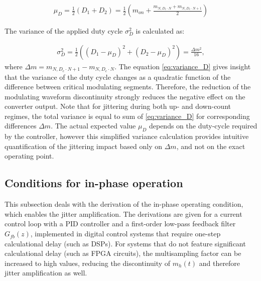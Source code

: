 \documentclass[journal]{IEEEtran}
\begin{document}
\begin{equation}
\begin{aligned}
\mu_D = \frac{1}{2} \left(D_1 + D_2 \right) = \frac{1}{2} \left(m_{on} +  \frac{ m_{N , D_c \cdot N} + m_{N , D_c \cdot N + 1}}{2}\right) \label{eq:expected_D} 
\end{aligned}    
\end{equation}

\noindent
The variance of the applied duty cycle $ \sigma ^2 _D$ is calculated as:

\begin{equation}
\begin{aligned}
 \sigma ^2 _D = \frac{1}{2} \left( \left( D_1 - \mu _D \right)^2 + \left( D_2 - \mu _D  \right)^2 \right)
= \frac{\Delta m^2 }{16},	\label{eq:variance_D} 
\end{aligned}    
\end{equation}
where $\Delta m = m_{N , D_c \cdot N + 1} - m_{N , D_c \cdot N}$.
\noindent
The equation \eqref{eq:variance_D} gives insight that the variance of the duty cycle changes as a quadratic function of the difference between critical modulating segments. Therefore, the reduction of the modulating waveform discontinuity strongly reduces the negative effect on the converter output. Note that for jittering during both up- and down-count regimes, the total variance is equal to sum of \eqref{eq:variance_D} for corresponding differences $\Delta m$. The actual expected value $\mu_D$ depends on the duty-cycle required by the controller, however this simplified variance calculation provides intuitive quantification of the jittering impact based only on $\Delta m$, and not on the exact operating point.

\subsection{Conditions for in-phase operation}
This subsection deals with the derivation of the in-phase operating condition, which enables the jitter amplification. The derivations are given for a current control loop with a PID controller and a first-order low-pass feedback filter $G_{fb}(z)$, implemented in digital control systems that require one-step calculational delay (such as DSPs). For systems that do not feature significant calculational delay (such as FPGA circuits), the multisampling factor can be increased to high values, reducing the discontinuity of $m_h(t)$ and therefore jitter amplification as well.
\end{document}
